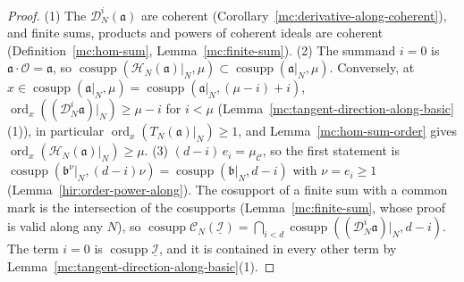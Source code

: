 \begin{proof}
\leanok
(1) The \(\mathcal D_N^i(\mathfrak a)\) are coherent (Corollary~\ref{mc:derivative-along-coherent}), and finite sums, products and powers of coherent ideals are coherent
(Definition~\ref{mc:hom-sum}, Lemma~\ref{mc:finite-sum}).
(2) The summand \(i=0\) is \(\mathfrak a\cdot\mathcal O=\mathfrak a\), so \(\operatorname{cosupp}(\mathcal H_N(\mathfrak a)|_N,\mu)\subset\operatorname{cosupp}(\mathfrak a|_N,\mu)\). Conversely, at
\(x\in\operatorname{cosupp}(\mathfrak a|_N,\mu)=\operatorname{cosupp}(\mathfrak a|_N,(\mu-i)+i)\), \(\operatorname{ord}_x((\mathcal D_N^i\mathfrak a)|_N)\ge\mu-i\) for \(i<\mu\)
(Lemma~\ref{mc:tangent-direction-along-basic}(1)), in particular \(\operatorname{ord}_x(T_N(\mathfrak a)|_N)\ge1\), and Lemma~\ref{mc:hom-sum-order} gives
\(\operatorname{ord}_x(\mathcal H_N(\mathfrak a)|_N)\ge\mu\).
(3) \((d-i)\,e_i=\mu_{\mathcal C}\), so the first statement is \(\operatorname{cosupp}(\mathfrak b^{\nu}|_N,(d-i)\nu)=\operatorname{cosupp}(\mathfrak b|_N,d-i)\) with \(\nu=e_i\ge1\)
(Lemma~\ref{hir:order-power-along}). The cosupport of a finite sum with a common mark is the intersection of the cosupports (Lemma~\ref{mc:finite-sum}, whose proof
is valid along any \(N\)), so \(\operatorname{cosupp}\mathcal C_N(\underline{\mathcal I})=\bigcap_{i<d}\operatorname{cosupp}((\mathcal D_N^i\mathfrak a)|_N,d-i)\). The term \(i=0\) is
\(\operatorname{cosupp}\underline{\mathcal I}\), and it is contained in every other term by Lemma~\ref{mc:tangent-direction-along-basic}(1).
\end{proof}